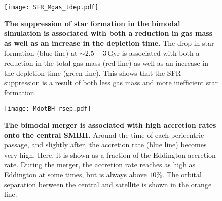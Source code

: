 \documentclass[linenumbers, twocolumn]{aastex631}
\newcommand{\Gyr}{\ensuremath{\textrm{Gyr}}}
\begin{document}
\begin{figure*}
  \centering
  \texttt{[image: SFR\_Mgas\_tdep.pdf]}
  \caption{\textbf{The suppression of star formation in the bimodal simulation is associated with both a reduction in gas mass as well as an increase in the depletion time.} The drop in star formation (blue line) at $\sim2.5-3\,\Gyr$ is associated with both a reduction in the total gas mass (red line) as well as an increase in the depletion time (green line). This shows that the SFR suppression is a result of both less gas mass and more inefficient star formation.}
  \label{fig:SFR_Mgas_tdep}
\end{figure*}

\begin{figure}
  \centering
  \texttt{[image: MdotBH\_rsep.pdf]}
  \caption{\textbf{The bimodal merger is associated with high accretion rates onto the central SMBH.} Around the time of each pericentric passage, and slightly after, the accretion rate (blue line) becomes very high. Here, it is shown as a fraction of the Eddington accretion rate. During the merger, the accretion rate reaches as high as Eddington at some times, but is always above $10\%$. The orbital separation between the central and satellite is shown in the orange line.}
  \label{fig:MdotBH_rsep}
\end{figure}
\end{document}
